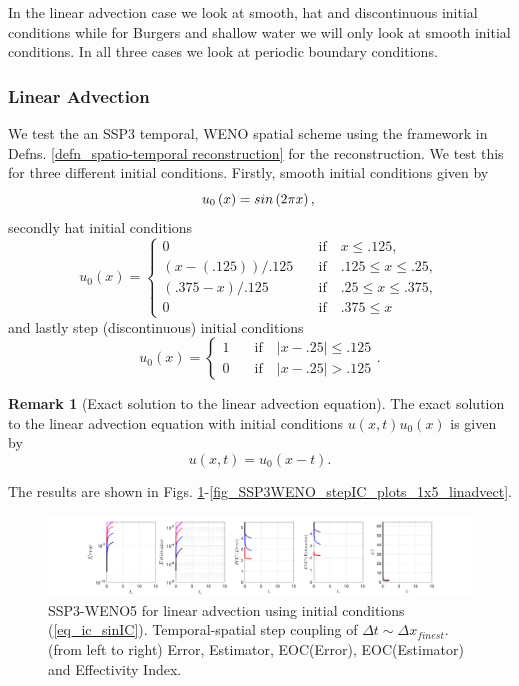 \documentclass[12pt,a4paper]{article}
\numberwithin{equation}{section}
\theoremstyle{definition}
\newcommand{\norm}[1]{\left|#1\right|}
\newcommand{\qp}[1]{\left(#1\right)}
\newtheorem{Rem}[subsection]{Remark}
\begin{document}
In the linear advection case we look at smooth, hat and discontinuous initial conditions while for Burgers and shallow water we will only look at smooth initial conditions.  In all three cases we look at periodic boundary conditions.
\subsubsection{Linear Advection}
We  test the an SSP3 temporal, WENO spatial scheme using the framework in Defns. \ref{defn_spatio-temporal reconstruction} for the reconstruction.  We test this for three different initial conditions.  Firstly, smooth initial conditions given by 
\begin{equation}\label{eq_ic_sinIC}
u_0\qp{x} = sin\qp{2\pi x},\\
\end{equation}
secondly hat initial conditions
\begin{equation}\label{eq_ic_hat}
u_0\qp{x}=\begin{cases}
0\quad &\text{if} \quad x\leq .125,\\
\qp{x-\qp{  .125}}/.125 \quad &\text{if}\quad .125\leq x\leq .25,\\
\qp{.375-x}/.125\quad&\text{if}\quad  .25\leq x\leq .375,\\
0\quad&\text{if}\quad  .375\leq x
\end{cases}
\end{equation}
and lastly step (discontinuous) initial conditions
\begin{equation}\label{eq_ic_step}
u_0\qp{x}=\begin{cases}
1\quad&\text{if}\quad \norm{x-.25}\leq .125\\
0\quad&\text{if} \quad \norm{x-.25}> .125
\end{cases}.
\end{equation}
\begin{Rem}[Exact solution to the linear advection equation]  The exact solution to the linear advection equation with initial conditions $u\qp{x,t}u_0\qp{x}$ is given by
	\begin{equation}
	u\qp{x,t}=u_0\qp{x-t}.
	\end{equation}
\end{Rem}
The results are shown in Figs. \ref{fig_SSP3WENO_sinIC_plots_1x5_linadvect}-\ref{fig_SSP3WENO_stepIC_plots_1x5_linadvect}.
\begin{figure}[H]
	\hspace{-3cm}
	\includegraphics[scale=0.55]{../figures/fig_SSP3WENO_sinIC_plots_1x5_linadvect}	
	\caption{SSP3-WENO5 for linear advection using initial conditions (\ref{eq_ic_sinIC}).  Temporal-spatial step coupling of $\Delta t\sim \Delta x_{finest}$. (from left to right) Error, Estimator, EOC(Error), EOC(Estimator) and Effectivity Index.}
	\label{fig_SSP3WENO_sinIC_plots_1x5_linadvect}
\end{figure}
\end{document}
